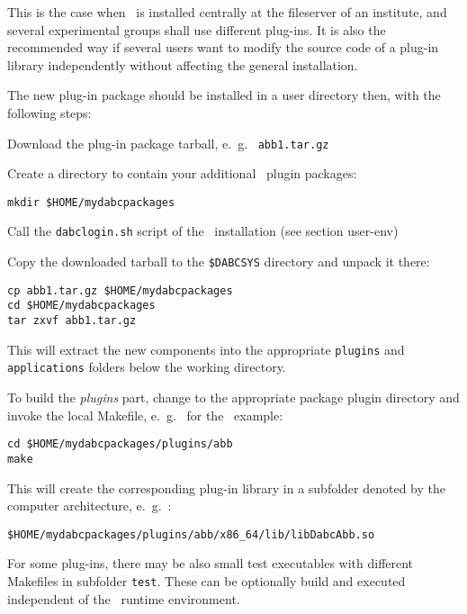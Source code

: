 This is the case when \dabc\ is installed centrally at the fileserver
of an institute, and several experimental groups shall use different plug-ins.
It is also the recommended way if several users 
want to modify the source code of a plug-in library independently without 
affecting the general installation.


The new plug-in package should be installed in a user directory
then, with the following steps:

\bnum
\item Download the plug-in package tarball, e.~g.~ {\tt abb1.tar.gz}

\item Create a directory to contain your additional \dabc\ plugin packages:
\begin{verbatim}
mkdir $HOME/mydabcpackages
\end{verbatim} 

\item Call the {\tt dabclogin.sh} script of the \dabc\ installation (see section user-env)

\item Copy the downloaded tarball to the {\tt \$DABCSYS} directory and unpack it there:
\begin{verbatim}
cp abb1.tar.gz $HOME/mydabcpackages
cd $HOME/mydabcpackages
tar zxvf abb1.tar.gz
\end{verbatim} 
This will extract the new components into the appropriate {\tt plugins} and
{\tt applications} folders below the working directory. 

\item To build the {\em plugins} part, change to the appropriate package plugin
directory and invoke the local Makefile, e.~g.~ for the \ABB\ example:

\begin{verbatim}
cd $HOME/mydabcpackages/plugins/abb
make
\end{verbatim} 
This will create the corresponding plug-in library in a subfolder denoted by the
computer architecture, e.~g.~:
\begin{verbatim}
$HOME/mydabcpackages/plugins/abb/x86_64/lib/libDabcAbb.so
\end{verbatim} 


\item For some plug-ins, there may be also small test executables with different Makefiles in subfolder {\tt test}. These can be optionally build and executed independent of the
\dabc\ runtime environment.

